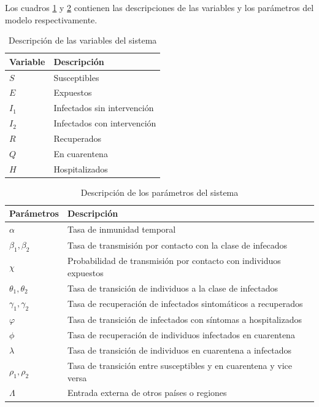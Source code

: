 \documentclass[conference]{IEEEtran}
\begin{document}
Los cuadros \ref{var_desc} y \ref{sys_pars} contienen las descripciones de las
variables y los parámetros del modelo respectivamente.

\begin{table}[h]
    \centering
    \begin{tabular}{ll}
    \hline
    Variable & Descripción                 \\ \hline
    $S$      & Susceptibles                \\ 
    $E$      & Expuestos                   \\ 
    $I_1$    & Infectados sin intervención \\ 
    $I_2$    & Infectados con intervención \\ 
    $R$      & Recuperados                 \\ 
    $Q$      & En cuarentena               \\ 
    $H$      & Hospitalizados              \\ \hline
    \end{tabular}
    \caption{Descripción de las variables del sistema}
    \label{var_desc}
\end{table}


\begin{table}[h]
    \begin{tabular}{ll}
    \hline
    Parámetros            & Descripción                                                        \\ \hline
    $\alpha$              & Tasa de inmunidad temporal                                         \\ 
    $\beta_1, \beta_2$    & Tasa de transmisión por contacto con la clase de infecados         \\ 
    $\chi$                & Probabilidad de transmisión por contacto con individuos expuestos  \\ 
    $\theta_1 , \theta_2$ & Tasa de transición de individuos a la clase de infectados          \\ 
    $\gamma_1 , \gamma_2$ & Tasa de recuperación de infectados sintomáticos a recuperados      \\ 
    $\varphi$                & Tasa de transición de infectados con síntomas a hospitalizados     \\ 
    $\phi$                & Tasa de recuperación de individuos infectados en cuarentena        \\ 
    $\lambda$             & Tasa de transición de individuos en cuarentena a infectados        \\ 
    $\rho_1 , \rho_2$     & Tasa de transición entre susceptibles y en cuarentena y vice versa \\ 
    $\Lambda$             & Entrada externa de otros países o regiones                         \\ \hline
    \end{tabular}
    \caption{Descripción de los parámetros del sistema}
    \label{sys_pars}
\end{table}
\end{document}
